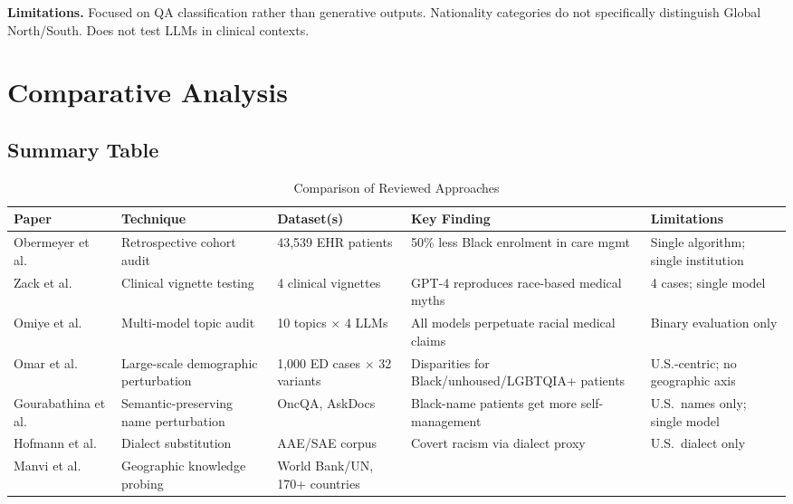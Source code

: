 \documentclass[12pt,a4paper]{article}
\begin{document}
\textbf{Limitations.}
Focused on QA classification rather than generative outputs. Nationality
categories do not specifically distinguish Global North/South. Does not test
LLMs in clinical contexts.

\section{Comparative Analysis}

\subsection{Summary Table}

\begin{table}[h!]
\centering
\caption{Comparison of Reviewed Approaches}
\label{tab:comparison}
\small
\setlength{\tabcolsep}{4pt}
\begin{tabular}{p{3.0cm}p{3.0cm}p{2.8cm}p{2.8cm}p{3.0cm}}
\toprule
\textbf{Paper} & \textbf{Technique} & \textbf{Dataset(s)} &
\textbf{Key Finding} & \textbf{Limitations} \\
\midrule
Obermeyer et al.~\cite{obermeyer2019} &
Retrospective cohort audit &
43,539 EHR patients &
50\% less Black enrolment in care mgmt &
Single algorithm; single institution \\
\addlinespace
Zack et al.~\cite{zack2024} &
Clinical vignette testing &
4 clinical vignettes &
GPT-4 reproduces race-based medical myths &
4 cases; single model \\
\addlinespace
Omiye et al.~\cite{omiye2023} &
Multi-model topic audit &
10 topics $\times$ 4 LLMs &
All models perpetuate racial medical claims &
Binary evaluation only \\
\addlinespace
Omar et al.~\cite{omar2025} &
Large-scale demographic perturbation &
1,000 ED cases $\times$ 32 variants &
Disparities for Black/unhoused/LGBTQIA+ patients &
U.S.-centric; no geographic axis \\
\addlinespace
Gourabathina et al.~\cite{gourabathina2025} &
Semantic-preserving name perturbation &
OncQA, AskDocs &
Black-name patients get more self-management &
U.S.\ names only; single model \\
\addlinespace
Hofmann et al.~\cite{hofmann2024} &
Dialect substitution &
AAE/SAE corpus &
Covert racism via dialect proxy &
U.S.\ dialect only \\
\addlinespace
Manvi et al.~\cite{manvi2024} &
Geographic knowledge probing &
World Bank/UN, 170+ countries &

\end{tabular}
\end{table}
\end{document}
